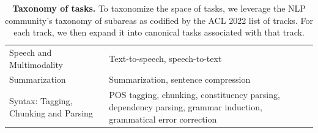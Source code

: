 \begin{table}[htp]
{\begin{tabular}{ll}
Speech and Multimodality & Text-to-speech, speech-to-text\\
Summarization & Summarization, sentence compression\\
Syntax: Tagging, Chunking and Parsing & POS tagging, chunking, constituency parsing, dependency parsing, grammar induction, grammatical error correction \\
\bottomrule
\end{tabular}}
\caption{\textbf{Taxonomy of tasks.} To taxonomize the space of tasks, we leverage the NLP community’s taxonomy of subareas as codified by the ACL 2022 list of tracks. 
For each track, we then expand it into canonical tasks associated
with that track.}
\label{tab:tasks}
\end{table}